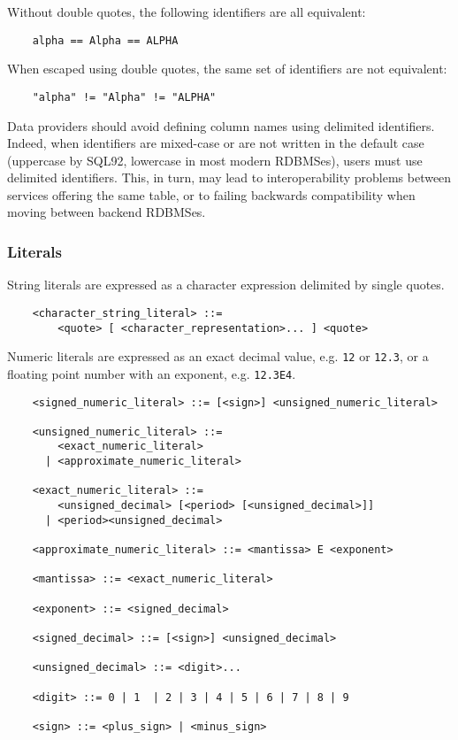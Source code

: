 \documentclass[11pt,a4paper]{ivoa}
\begin{document}
Without double quotes, the following identifiers are all equivalent:
\begin{verbatim}
    alpha == Alpha == ALPHA
\end{verbatim}

When escaped using double quotes, the same set of identifiers are not equivalent:
\begin{verbatim}
    "alpha" != "Alpha" != "ALPHA"
\end{verbatim}

Data providers should avoid defining column names using delimited identifiers.
Indeed, when identifiers are mixed-case or are not written in the default case
(uppercase by SQL92, lowercase in most modern RDBMSes), users must use delimited
identifiers. This, in turn, may lead to interoperability problems between
services offering the same table, or to failing backwards compatibility when
moving between backend RDBMSes.

\subsubsection{Literals}
\label{sec:literals}

String literals are expressed as a character expression delimited by single quotes.

\begin{verbatim}
    <character_string_literal> ::=
        <quote> [ <character_representation>... ] <quote>
\end{verbatim}

Numeric literals are expressed as an exact decimal value, e.g. \verb:12: or
\verb:12.3:, or a floating point number with an exponent, e.g. \verb:12.3E4:.

\begin{verbatim}
    <signed_numeric_literal> ::= [<sign>] <unsigned_numeric_literal>

    <unsigned_numeric_literal> ::=
        <exact_numeric_literal>
      | <approximate_numeric_literal>

    <exact_numeric_literal> ::=
        <unsigned_decimal> [<period> [<unsigned_decimal>]]
      | <period><unsigned_decimal>

    <approximate_numeric_literal> ::= <mantissa> E <exponent>

    <mantissa> ::= <exact_numeric_literal>

    <exponent> ::= <signed_decimal>

    <signed_decimal> ::= [<sign>] <unsigned_decimal>

    <unsigned_decimal> ::= <digit>...

    <digit> ::= 0 | 1  | 2 | 3 | 4 | 5 | 6 | 7 | 8 | 9

    <sign> ::= <plus_sign> | <minus_sign>
\end{verbatim}
\end{document}
